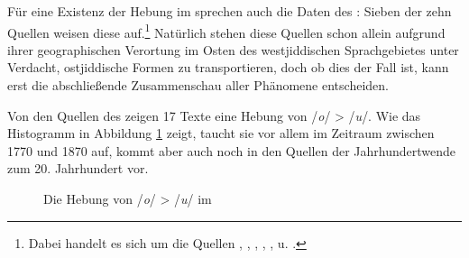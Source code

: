     
 Für eine Existenz der Hebung im \hai{{\WJ}} sprechen auch die Daten des : Sieben der zehn Quellen weisen diese auf.\footnote{\label{FNo_u}Dabei handelt es sich um die Quellen , , , , ,  u. .} Natürlich stehen diese Quellen schon allein aufgrund ihrer geographischen Verortung im Osten des westjiddischen Sprachgebietes unter Verdacht, ostjiddische Formen zu transportieren, doch ob dies der Fall ist, kann erst die abschließende Zusammenschau aller Phänomene entscheiden.
             
Von den Quellen des  zeigen 17 Texte eine Hebung von /\textit{o}/ > /\textit{u}/. Wie das Histogramm in Abbildung \ref{histoo_u} zeigt, taucht sie
vor allem im Zeitraum zwischen 1770 und 1870 auf, kommt aber auch noch in den Quellen der Jahrhundertwende zum 20. Jahrhundert vor.  

\begin{figure}
	\caption{Die Hebung von /\textit{o}/ > /\textit{u}/ im }
	\label{histoo_u}	
\end{figure}


